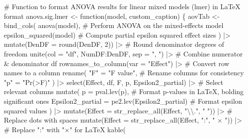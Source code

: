 \documentclass[
  bookmarksnumbered]{article}
\newenvironment{Shaded}{\begin{snugshade}}{\end{snugshade}}
\newcommand{\AttributeTok}[1]{\textcolor[rgb]{0.80,0.80,0.80}{#1}}
\newcommand{\CommentTok}[1]{\textcolor[rgb]{0.50,0.62,0.50}{#1}}
\newcommand{\ControlFlowTok}[1]{\textcolor[rgb]{0.94,0.87,0.69}{#1}}
\newcommand{\DecValTok}[1]{\textcolor[rgb]{0.86,0.86,0.80}{#1}}
\newcommand{\FunctionTok}[1]{\textcolor[rgb]{0.94,0.94,0.56}{#1}}
\newcommand{\NormalTok}[1]{\textcolor[rgb]{0.80,0.80,0.80}{#1}}
\newcommand{\OtherTok}[1]{\textcolor[rgb]{0.94,0.94,0.56}{#1}}
\newcommand{\SpecialCharTok}[1]{\textcolor[rgb]{0.86,0.64,0.64}{#1}}
\newcommand{\StringTok}[1]{\textcolor[rgb]{0.80,0.58,0.58}{#1}}
\begin{document}
\begin{Shaded}
\begin{Highlighting}[]
\CommentTok{\# Function to format ANOVA results for linear mixed models (lmer) in LaTeX format}
\NormalTok{anova.sig.lmer }\OtherTok{\textless{}{-}} \ControlFlowTok{function}\NormalTok{(model, custom\_caption) \{}
\NormalTok{  aovTab }\OtherTok{\textless{}{-}} \FunctionTok{bind\_cols}\NormalTok{(}
    \FunctionTok{anova}\NormalTok{(model), }\CommentTok{\# Perform ANOVA on the mixed{-}effects model}
    \FunctionTok{epsilon\_squared}\NormalTok{(model) }\CommentTok{\# Compute partial epsilon squared effect sizes}
\NormalTok{  ) }\SpecialCharTok{|\textgreater{}}
    \FunctionTok{mutate}\NormalTok{(}\AttributeTok{DenDF =} \FunctionTok{round}\NormalTok{(DenDF, }\DecValTok{2}\NormalTok{)) }\SpecialCharTok{|\textgreater{}} \CommentTok{\# Round denominator degrees of freedom}
    \FunctionTok{unite}\NormalTok{(}\AttributeTok{col =} \StringTok{"df"}\NormalTok{, NumDF}\SpecialCharTok{:}\NormalTok{DenDF, }\AttributeTok{sep =} \StringTok{", "}\NormalTok{) }\SpecialCharTok{|\textgreater{}} \CommentTok{\# Combine numerator \& denominator df}
    \FunctionTok{rownames\_to\_column}\NormalTok{(}\AttributeTok{var =} \StringTok{"Effect"}\NormalTok{) }\SpecialCharTok{|\textgreater{}} \CommentTok{\# Convert row names to a column}
    \FunctionTok{rename}\NormalTok{(}
      \StringTok{"F"} \OtherTok{=} \StringTok{"F value"}\NormalTok{, }\CommentTok{\# Rename columns for consistency}
      \StringTok{"p"} \OtherTok{=} \StringTok{"Pr(\textgreater{}F)"}
\NormalTok{    ) }\SpecialCharTok{|\textgreater{}}
    \FunctionTok{select}\NormalTok{(Effect, df, F, p, Epsilon2\_partial) }\SpecialCharTok{|\textgreater{}} \CommentTok{\# Select relevant columns}
    \FunctionTok{mutate}\NormalTok{(}
      \AttributeTok{p =} \FunctionTok{pval.lev}\NormalTok{(p), }\CommentTok{\# Format p{-}values in LaTeX, bolding significant ones}
      \AttributeTok{Epsilon2\_partial =} \FunctionTok{pe2.lev}\NormalTok{(Epsilon2\_partial) }\CommentTok{\# Format epsilon squared values}
\NormalTok{    ) }\SpecialCharTok{|\textgreater{}}
    \FunctionTok{mutate}\NormalTok{(}\AttributeTok{Effect =} \FunctionTok{str\_replace\_all}\NormalTok{(Effect, }\StringTok{"}\SpecialCharTok{\textbackslash{}\textbackslash{}}\StringTok{."}\NormalTok{, }\StringTok{" "}\NormalTok{)) }\SpecialCharTok{|\textgreater{}} \CommentTok{\# Replace dots with spaces}
    \FunctionTok{mutate}\NormalTok{(}\AttributeTok{Effect =} \FunctionTok{str\_replace\_all}\NormalTok{(Effect, }\StringTok{":"}\NormalTok{, }\StringTok{" × "}\NormalTok{)) }\SpecialCharTok{|\textgreater{}} \CommentTok{\# Replace ":" with "×" for LaTeX}
    \FunctionTok{kable}\NormalTok{(}

\end{Highlighting}
\end{Shaded}
\end{document}
